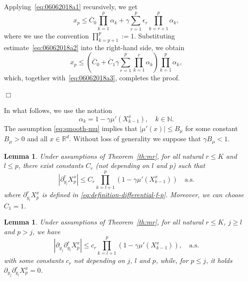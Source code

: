 \documentclass[bj]{imsart}
\newcommand{\proofendsign}{$\Box$}
\newtheorem{lem}[thm]{Lemma}
\newenvironment{proof}{{\noindent \bf Proof }}
 {{\hspace*{\fill}\proofendsign\par\bigskip}}
\newcommand*{\ol}{\overline}
\begin{document}
\begin{proof}
Applying~\eqref{eq:06062018a1} recursively, we get
$$
x_p\le\ol C_0\prod_{k=1}^p \alpha_k
+\gamma\sum_{r=1}^p \epsilon_r
\prod_{k=r+1}^p \alpha_k,
$$
where we use the convention $\prod_{k=p+1}^p:=1$.
Substituting estimate~\eqref{eq:06062018a2}
into the right-hand side, we obtain
$$
x_p\le\left(\ol C_0+\ol C_1
\gamma\sum_{r=1}^p  \prod_{k=1}^r \alpha_k
\right)
\prod_{k=1}^p \alpha_k,
$$
which, together with~\eqref{eq:06062018a3}, completes the proof.
\end{proof}
In what follows, we use the notation
\begin{equation}
\label{eq:definition-alpha}
\alpha_k=1-\gamma \mu'(X_{k-1}^x),\quad k\in\mathbb N.
\end{equation}
The assumption \eqref{eq:smooth-mu} implies that  $|\mu'(x)|\leq B_\mu$ for some constant $B_\mu>0$ and all $x\in \mathbb{R}^d$. Without loss of generality we suppose that $\gamma B_\mu<1.$
\begin{lem}\label{lem:06062018a2}
Under assumptions of Theorem~\ref{th:mr},
for all natural $r\le K$ and $l\le p$, there exist constants $C_r$ (not depending on $l$ and $p$) such that
\begin{equation}
\label{eq:08062018b2}
\left|\partial_{y_l}^r X^x_p \right| \le C_r\prod_{k=l+1}^p (1-\gamma\mu'(X^x_{k-1}))\quad \text{a.s.}
\end{equation}
where $\partial_{y_l}^r X^x_p$ is defined in \eqref{eq:definition-differential-f-p}. Moreover, we can choose $C_1=1$.
\end{lem}
\begin{lem}\label{lem:06062018a3}
Under assumptions of Theorem~\ref{th:mr},
for all natural $r\le K$, $j\ge l$ and $p>j$, we have
\begin{equation}\label{eq:08062018b3}
\left|\partial_{y_j} \partial_{y_l}^r X^x_p\right|
\le c_r\prod_{k=l+1}^p (1-\gamma\mu'(X^x_{k-1})), \quad \text{a.s.}
\end{equation}
with some constants $c_r$
not depending on $j$, $l$ and $p$,
while, for $p\le j$, it holds
$\partial_{y_{j}}\partial_{y_{l}}^{r}X^x_{p}=0$.
\end{lem}
\end{document}
